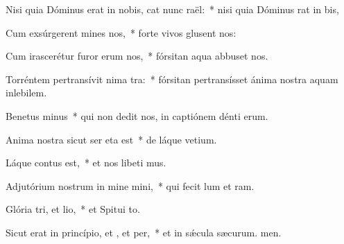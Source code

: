 \item Nisi quia Dóminus erat in nobis, cat nunc raël:~* nisi quia Dóminus rat in bis,
\item Cum exsúrgerent mines  nos,~* forte vivos glusent nos:
\item Cum irascerétur furor erum  nos,~* fórsitan aqua abbuset nos.
\item Torréntem pertransívit nima tra:~* fórsitan pertransísset ánima nostra aquam inlebilem.
\item Benetus minus~* qui non dedit nos, in captiónem dénti erum.
\item Anima nostra sicut ser eta est~* de láque vetium.
\item Láque contus est,~* et nos libeti mus.
\item Adjutórium nostrum in mine mini,~* qui fecit lum et ram.
\item Glória tri, et lio,~* et Spitui to.
\item Sicut erat in princípio, et , et per,~* et in sǽcula sæcurum. men.
